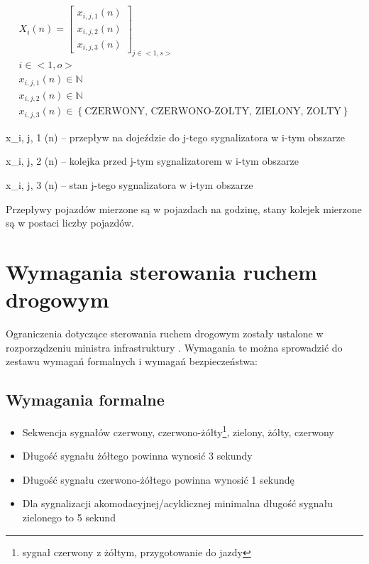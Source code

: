 \begin{equation}
	\begin{array}{c}
		X_i (n) = \left[
			\begin{array}{c}
				x_{i, j, 1} (n) \\ x_{i, j, 2} (n) \\ x_{i, j, 3} (n)
			\end{array}
		\right]_{j \in <1,s>}\\
		i \in <1,o>\\
		x_{i, j, 1} (n) \in \mathbb{N}\\
		x_{i, j, 2} (n) \in \mathbb{N}\\
		x_{i, j, 3} (n) \in \left\{ \textrm{CZERWONY, CZERWONO-ZOLTY, ZIELONY, ZOLTY} \right\}
	\end{array}
\end{equation}

x_{i, j, 1} (n) \textrm{ -- przepływ na dojeździe do j-tego sygnalizatora w i-tym obszarze}

x_{i, j, 2} (n) \textrm{ -- kolejka przed j-tym sygnalizatorem w i-tym obszarze}

x_{i, j, 3} (n) \textrm{ -- stan j-tego sygnalizatora w i-tym obszarze}

\vspace{0.5cm}
Przepływy pojazdów mierzone są w pojazdach na godzinę, stany kolejek mierzone są w postaci liczby pojazdów.

\section{Wymagania sterowania ruchem drogowym}
\label{sec:model_ograniczenia}
Ograniczenia dotyczące sterowania ruchem drogowym zostały ustalone w rozporządzeniu ministra infrastruktury \cite{rozporzadzenie}. Wymagania te można sprowadzić do zestawu wymagań formalnych i wymagań bezpieczeństwa:
\subsection{Wymagania formalne}
\begin{itemize}
	\item Sekwencja sygnałów czerwony, czerwono-żółty\footnote{sygnał czerwony z żółtym, przygotowanie do jazdy}, zielony, żółty, czerwony
	\item Długość sygnału żółtego powinna wynosić 3 sekundy
	\item Długość sygnału czerwono-żółtego powinna wynosić 1 sekundę
	\item Dla sygnalizacji akomodacyjnej/acyklicznej minimalna długość sygnału zielonego to 5 sekund
\end{itemize}

